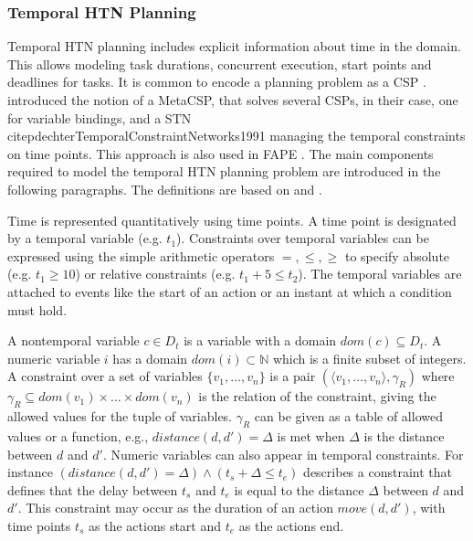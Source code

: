 \subsubsection{Temporal HTN Planning}\label{sec:temporal-htn-planning}

Temporal \ac{HTN} planning includes explicit information about time in the domain.
This allows modeling task durations, concurrent execution, start points and deadlines for tasks.
It is common to encode a planning problem as a \ac{CSP} \citep[chap.~8]{ghallabAutomatedPlanningTheory2004}.
\cite{stockHierarchicalHybridPlanning2015} introduced the notion of a MetaCSP, that solves several \ac{CSP}s, in their case, one for variable bindings, and a \ac{STN} \\citep{dechterTemporalConstraintNetworks1991} managing the temporal constraints on time points.
This approach is also used in \ac{FAPE} \citep{bit-monnotTemporalHierarchicalModels2016a}.
The main components required to model the temporal \ac{HTN} planning problem are introduced in the following paragraphs. 
The definitions are based on \citet[chap.~14]{ghallabAutomatedPlanningTheory2004} and \citet{bit-monnotTemporalHierarchicalModels2016a}.


Time is represented quantitatively using time points. %
A time point is designated by a temporal variable (e.g. $t_1$).
Constraints over temporal variables can be expressed using the simple arithmetic operators $=,\leq,\geq$ to specify absolute  (e.g. $t_1 \geq 10$) or relative constraints (e.g. $t_1 + 5 \leq t_2$).
The temporal variables are attached to events like the start of an action or an instant at which a condition must hold.

A nontemporal variable $c \in D_t$ is a variable with a domain $dom(c) \subseteq D_t$.
A numeric variable $i$ has a domain $dom(i) \subset \mathbb{N}$ which is a finite subset of integers.
A constraint over a set of variables $\{v_1,\dots,v_n \}$ is a pair $(\langle v_1, \dots, v_n \rangle, \gamma_R)$ where $\gamma_R \subseteq dom(v_1) \times \dots \times dom(v_n)$ is the relation of the constraint, giving the allowed values for the tuple of variables.
$\gamma_R$ can be given as a table of allowed values or a function, e.g., $\textit{distance}(d, d') = \Delta$ is met when $\Delta$ is the distance between $d$ and $d'$.
Numeric variables can also appear in temporal constraints.
For instance $(\textit{distance}(d, d') = \Delta) \land (t_s + \Delta \leq t_e)$ describes a constraint that defines that the delay between $t_s$ and $t_e$ is equal to the distance $\Delta$ between $d$ and $d'$.
This constraint may occur as the duration of an action $move(d,d')$, with time points $t_s$ as the actions start and $t_e$ as the actions end.

